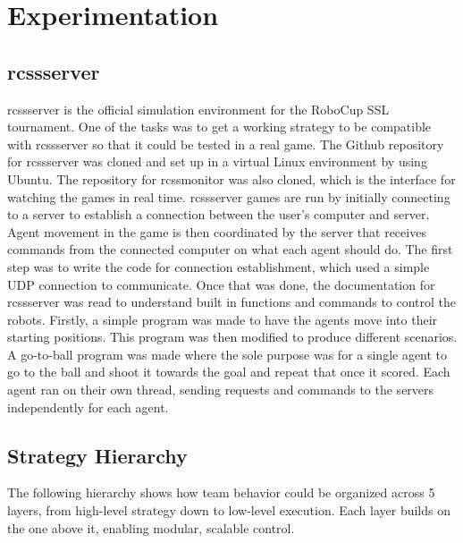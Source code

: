 \section{Experimentation}

\subsection{rcssserver}
rcssserver is the official simulation environment for the RoboCup SSL tournament\cite{rcsoccersim1}. One of the tasks was to get a working strategy to be compatible with rcssserver so that it could be tested in a real game. The Github repository for rcssserver was cloned and set up in a virtual Linux environment by using Ubuntu. The repository for rcssmonitor was also cloned, which is the interface for watching the games in real time. rcssserver games are run by initially connecting to a server to establish a connection between the user's computer and server. Agent movement in the game is then coordinated by the server that receives commands from the connected computer on what each agent should do. The first step was to write the code for connection establishment, which used a simple UDP connection to communicate. Once that was done, the documentation for rcssserver was read to understand built in functions and commands to control the robots\cite{rcssserverManual}. Firstly, a simple program was made to have the agents move into their starting positions. This program was then modified to produce different scenarios. A go-to-ball program was made where the sole purpose was for a single agent to go to the ball and shoot it towards the goal and repeat that once it scored. Each agent ran on their own thread, sending requests and commands to the servers independently for each agent.

\subsection{Strategy Hierarchy}
The following hierarchy shows how team behavior could be organized across 5 layers, from high-level strategy down to low-level execution. Each layer builds on the one above it, enabling modular, scalable control.

